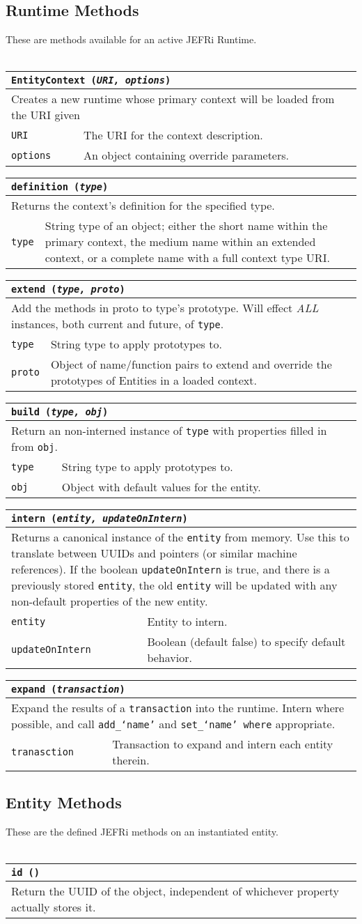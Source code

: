 \documentclass{article}
\newcommand{\ilcode}{\tt}
\newcommand{\method}[4]{
	\noindent
	\begin{tabular}{ | l | p{5in} | }
	\hline
	\multicolumn{2}{|l|}{\large \ilcode #1 ({\it #2})} \\
	\hline
	\multicolumn{2}{|p{6in}|}{#3} \\
	\hline
	#4
	\end{tabular}
}
\newcommand{\param}[2]{
	{\ilcode #1} & #2 \\
	\hline
}
\begin{document}
\subsection{Runtime Methods}
These are methods available for an active JEFRi Runtime.
\\
\\
\method{EntityContext}{URI, options}
{Creates a new runtime whose primary context will be loaded from the URI given}
	{
		\param{URI}{The URI for the context description.}
		\param{options}{An object containing override parameters.}
	}

\method{definition}{type}
	{Returns the context's definition for the specified type.}
	{\param{type}{String type of an object; either the short name within the
	primary context, the medium name within an extended context, or a complete
	name with a full context type URI.}}

\method{extend}{type, proto}
	{Add the methods in proto to type's prototype. Will effect {\it ALL}
	instances, both current and future, of {\ilcode type}. }
	{
		\param{type}{String type to apply prototypes to.}
		\param{proto}{Object of name/function pairs to extend and override the
		prototypes of Entities in a loaded context.}
	}

\method{build}{type, obj}
	{Return an non-interned instance of {\ilcode type} with properties
	filled in from {\ilcode obj}.}
	{
		\param{type}{String type to apply prototypes to.}
		\param{obj}{Object with default values for the entity.}
	}

\method{intern}{entity, updateOnIntern}
	{Returns a canonical instance of the {\ilcode entity} from memory. Use this
	to translate between UUIDs and pointers (or similar machine references). If
	the boolean {\ilcode updateOnIntern} is true, and there is a previously
	stored {\ilcode entity}, the old {\ilcode entity} will be updated with any
	non-default properties of the new entity.}
	{
		\param{entity}{Entity to intern.}
		\param{updateOnIntern}{Boolean (default false) to specify default
		behavior.}
	}

\method{expand}{transaction}
	{Expand the results of a {\ilcode transaction} into the runtime. Intern
	where possible, and call {\ilcode add\_`name'} and {\ilcode set\_`name'
	where} appropriate.}
	{\param{tranasction}{Transaction to expand and intern each entity therein.}}

\subsection{Entity Methods}
These are the defined JEFRi methods on an instantiated entity.
\\
\\
\method{id}{}
	{Return the UUID of the object, independent of whichever property
	actually stores it.}
	{}
\end{document}
